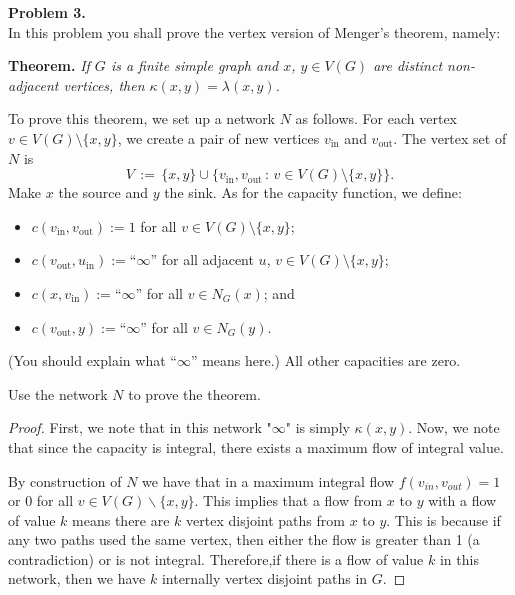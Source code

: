 \documentclass{article}
\newcommand{\defeq}{:=}
\newcommand{\set}[1]{\{#1\}}
\newenvironment{hwproof}[2]
{
    \textbf{Problem #1.}\\
    #2
    \begin{proof}
}{
    \end{proof}
    \newpage
}
\begin{document}
\begin{hwproof}
    {3}
    {In this problem you shall prove the vertex version of Menger's theorem, namely:

        \textbf{Theorem.} \textsl{If $G$ is a finite simple graph and $x$, $y \in V(G)$ are distinct non-adjacent vertices, then $\kappa(x,y) = \lambda(x,y)$.}

        To prove this theorem, we set up a network $N$ as follows. For each vertex $v \in V(G) \setminus \set{x,y}$, we create a pair of new vertices $v_{\mathrm{in}}$ and $v_{\mathrm{out}}$. The vertex set of $N$ is
        \[
            V \,\defeq\, \set{x,y} \cup \set{v_{\mathrm{in}}, v_{\mathrm{out}} \,:\, v \in V(G) \setminus \set{x,y}}.
        \]
        Make $x$ the source and $y$ the sink. As for the capacity function, we define:


        \begin{itemize}
            \item $c(v_{\mathrm{in}}, v_{\mathrm{out}}) \defeq 1$ for all $v \in V(G) \setminus \set{x,y}$;

            \item $c(v_{\mathrm{out}}, u_{\mathrm{in}}) \defeq \text{``}\infty\text{''}$ for all adjacent $u$, $v \in V(G) \setminus \set{x,y}$;

            \item $c(x, v_{\mathrm{in}}) \defeq \text{``}\infty\text{''}$ for all $v \in N_G(x)$; and

            \item $c(v_{\mathrm{out}}, y) \defeq \text{``}\infty\text{''}$ for all $v \in N_G(y)$.
        \end{itemize}

        (You should explain what $\text{``}\infty\text{''}$ means here.) All other capacities are zero.

        Use the network $N$ to prove the theorem.}

    First, we note that in this network "$\infty$" is simply $\kappa(x,y)$. Now, we note that since the capacity is integral, there exists a maximum flow of
    integral value.

    By construction of $N$ we have that in a maximum integral flow $f(v_{in}, v_{out}) = 1$ or 0 for all $v \in V(G)\backslash\set{x,y}$. This
    implies that a flow from $x$ to $y$ with a flow of value $k$ means there are $k$ vertex disjoint paths from $x$ to $y$. This is because if any two paths
    used the same vertex, then either the flow is greater than 1 (a contradiction) or is not integral. Therefore,if there is a flow of value $k$ in this network,
    then we have $k$ internally vertex disjoint paths in $G$.


\end{hwproof}
\end{document}
